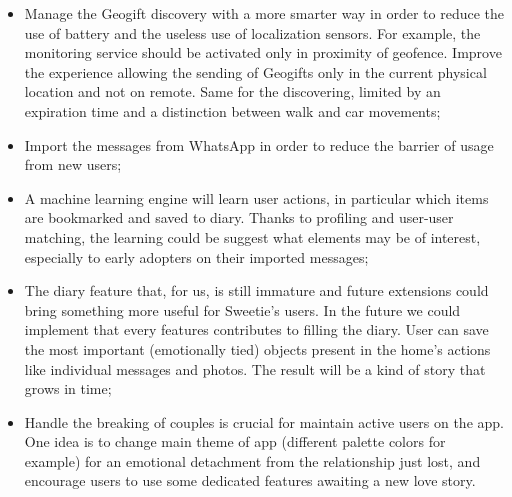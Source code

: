 \begin{itemize}
	\item Manage the Geogift discovery with a more smarter way in order to reduce the use of battery and the useless use of localization sensors. For example, the monitoring service should be activated only in proximity of geofence. Improve the experience allowing the sending of Geogifts only in the current physical location and not on remote. Same for the discovering, limited by an expiration time and a distinction between walk and car movements;
	
	\item Import the messages from WhatsApp in order to reduce the barrier of usage from new users;
	
	\item A machine learning engine will learn user actions, in particular which items are bookmarked and saved to diary. Thanks to profiling and user-user matching, the learning could be suggest what elements may be of interest, especially to early adopters on their imported messages;
	
	\item The diary feature that, for us, is still immature and future extensions could bring something more useful for Sweetie's users. In the future we could implement that every features contributes to filling the diary. User can save the most important (emotionally tied) objects present in the home's actions like individual messages and photos. The result will be a kind of story that grows in time;
	
	\item Handle the breaking of couples is crucial for maintain active users on the app. One idea is to change main theme of app (different palette colors for example) for an emotional detachment from the relationship just lost, and encourage users to use some dedicated features awaiting a new love story.
\end{itemize}



